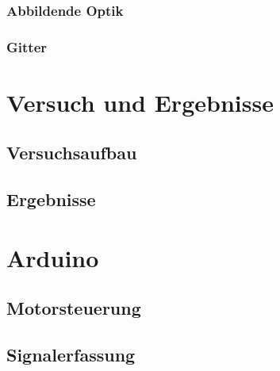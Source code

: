 \documentclass{article}
\begin{document}

\subsubsection{Abbildende Optik}


\subsubsection{Gitter}


\section{Versuch und Ergebnisse}


\subsection{Versuchsaufbau}


\subsection{Ergebnisse}


\section{Arduino} %

\subsection{Motorsteuerung}

\subsection{Signalerfassung}
\end{document}
